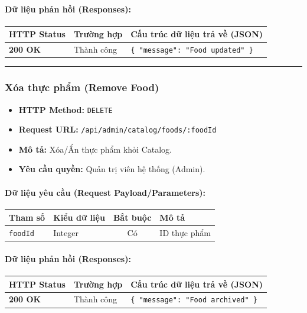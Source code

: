 \documentclass[12pt,a4paper]{article}
\begin{document}
\paragraph{Dữ liệu phản hồi (Responses):}
\begin{longtable}{|p{2.8cm}|p{3.2cm}|p{8.0cm}|}
\hline
\textbf{HTTP Status} & \textbf{Trường hợp} & \textbf{Cấu trúc dữ liệu trả về (JSON)} \\ \hline
\endhead
\textbf{200 OK} & Thành công & \texttt{\{ "message": "Food updated" \}} \\ \hline
\end{longtable}

\vskip 0.4cm
\noindent\rule{\textwidth}{0.3pt}
\vskip 0.4cm

\subsubsection{Xóa thực phẩm (Remove Food)}
\begin{itemize}[leftmargin=*]
    \item \textbf{HTTP Method:} \texttt{DELETE}
    \item \textbf{Request URL:} \texttt{/api/admin/catalog/foods/:foodId}
    \item \textbf{Mô tả:} Xóa/Ẩn thực phẩm khỏi Catalog.
    \item \textbf{Yêu cầu quyền:} Quản trị viên hệ thống (Admin).
\end{itemize}

\paragraph{Dữ liệu yêu cầu (Request Payload/Parameters):}
\begin{longtable}{|p{2.8cm}|p{2.2cm}|c|p{7.0cm}|}
\hline
\textbf{Tham số} & \textbf{Kiểu dữ liệu} & \textbf{Bắt buộc} & \textbf{Mô tả} \\ \hline
\endhead
\texttt{foodId} & Integer & Có & ID thực phẩm \\ \hline
\end{longtable}

\paragraph{Dữ liệu phản hồi (Responses):}
\begin{longtable}{|p{2.8cm}|p{3.2cm}|p{8.0cm}|}
\hline
\textbf{HTTP Status} & \textbf{Trường hợp} & \textbf{Cấu trúc dữ liệu trả về (JSON)} \\ \hline
\endhead
\textbf{200 OK} & Thành công & \texttt{\{ "message": "Food archived" \}} \\ \hline
\end{longtable}
\end{document}
